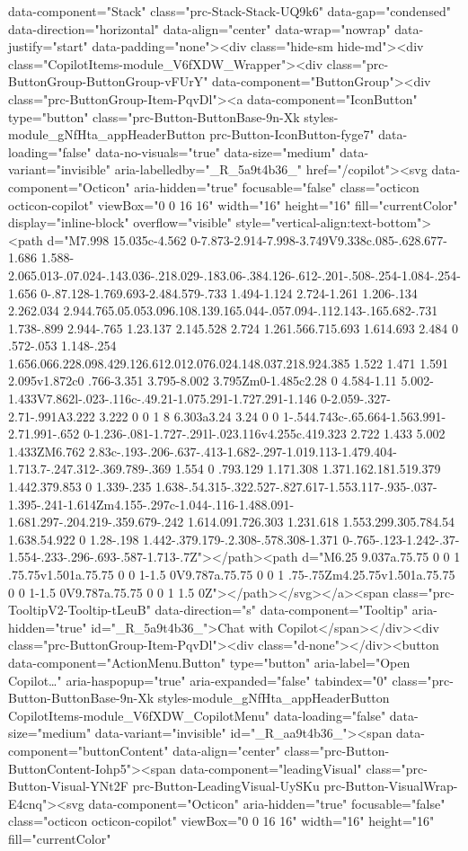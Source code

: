 data-component="Stack" class="prc-Stack-Stack-UQ9k6" data-gap="condensed" data-direction="horizontal" data-align="center" data-wrap="nowrap" data-justify="start" data-padding="none"><div class="hide-sm hide-md"><div class="CopilotItems-module_V6fXDW_Wrapper"><div class="prc-ButtonGroup-ButtonGroup-vFUrY" data-component="ButtonGroup"><div class="prc-ButtonGroup-Item-PqvDl"><a data-component="IconButton" type="button" class="prc-Button-ButtonBase-9n-Xk styles-module_gNfHta_appHeaderButton prc-Button-IconButton-fyge7" data-loading="false" data-no-visuals="true" data-size="medium" data-variant="invisible" aria-labelledby="_R_5a9t4b36_" href="/copilot"><svg data-component="Octicon" aria-hidden="true" focusable="false" class="octicon octicon-copilot" viewBox="0 0 16 16" width="16" height="16" fill="currentColor" display="inline-block" overflow="visible" style="vertical-align:text-bottom"><path d="M7.998 15.035c-4.562 0-7.873-2.914-7.998-3.749V9.338c.085-.628.677-1.686 1.588-2.065.013-.07.024-.143.036-.218.029-.183.06-.384.126-.612-.201-.508-.254-1.084-.254-1.656 0-.87.128-1.769.693-2.484.579-.733 1.494-1.124 2.724-1.261 1.206-.134 2.262.034 2.944.765.05.053.096.108.139.165.044-.057.094-.112.143-.165.682-.731 1.738-.899 2.944-.765 1.23.137 2.145.528 2.724 1.261.566.715.693 1.614.693 2.484 0 .572-.053 1.148-.254 1.656.066.228.098.429.126.612.012.076.024.148.037.218.924.385 1.522 1.471 1.591 2.095v1.872c0 .766-3.351 3.795-8.002 3.795Zm0-1.485c2.28 0 4.584-1.11 5.002-1.433V7.862l-.023-.116c-.49.21-1.075.291-1.727.291-1.146 0-2.059-.327-2.71-.991A3.222 3.222 0 0 1 8 6.303a3.24 3.24 0 0 1-.544.743c-.65.664-1.563.991-2.71.991-.652 0-1.236-.081-1.727-.291l-.023.116v4.255c.419.323 2.722 1.433 5.002 1.433ZM6.762 2.83c-.193-.206-.637-.413-1.682-.297-1.019.113-1.479.404-1.713.7-.247.312-.369.789-.369 1.554 0 .793.129 1.171.308 1.371.162.181.519.379 1.442.379.853 0 1.339-.235 1.638-.54.315-.322.527-.827.617-1.553.117-.935-.037-1.395-.241-1.614Zm4.155-.297c-1.044-.116-1.488.091-1.681.297-.204.219-.359.679-.242 1.614.091.726.303 1.231.618 1.553.299.305.784.54 1.638.54.922 0 1.28-.198 1.442-.379.179-.2.308-.578.308-1.371 0-.765-.123-1.242-.37-1.554-.233-.296-.693-.587-1.713-.7Z"></path><path d="M6.25 9.037a.75.75 0 0 1 .75.75v1.501a.75.75 0 0 1-1.5 0V9.787a.75.75 0 0 1 .75-.75Zm4.25.75v1.501a.75.75 0 0 1-1.5 0V9.787a.75.75 0 0 1 1.5 0Z"></path></svg></a><span class="prc-TooltipV2-Tooltip-tLeuB" data-direction="s" data-component="Tooltip" aria-hidden="true" id="_R_5a9t4b36_">Chat with Copilot</span></div><div class="prc-ButtonGroup-Item-PqvDl"><div class="d-none"></div><button data-component="ActionMenu.Button" type="button" aria-label="Open Copilot…" aria-haspopup="true" aria-expanded="false" tabindex="0" class="prc-Button-ButtonBase-9n-Xk styles-module_gNfHta_appHeaderButton CopilotItems-module_V6fXDW_CopilotMenu" data-loading="false" data-size="medium" data-variant="invisible" id="_R_aa9t4b36_"><span data-component="buttonContent" data-align="center" class="prc-Button-ButtonContent-Iohp5"><span data-component="leadingVisual" class="prc-Button-Visual-YNt2F prc-Button-LeadingVisual-UySKu prc-Button-VisualWrap-E4cnq"><svg data-component="Octicon" aria-hidden="true" focusable="false" class="octicon octicon-copilot" viewBox="0 0 16 16" width="16" height="16" fill="currentColor" 